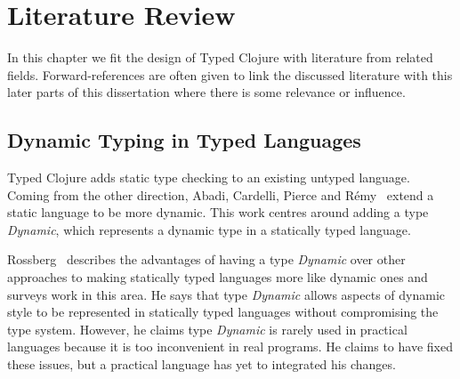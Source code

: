 
\chapter{Literature Review}

In this chapter we fit the design of Typed Clojure with literature from related fields.
Forward-references are often given to link the discussed literature with this later parts
of this dissertation
where there is some relevance or influence.


\section{Dynamic Typing in Typed Languages}

Typed Clojure adds static type checking to an existing untyped language.
Coming from the other direction, Abadi, Cardelli, Pierce and R\'{e}my~\cite{ACPR95}
extend a static language to be more dynamic.
This work centres around adding a type \emph{Dynamic}, which represents
a dynamic type in a statically typed language.

Rossberg~\cite{Ros07} describes the advantages of having a type
\emph{Dynamic} over other approaches to making statically typed languages
more like dynamic ones and surveys work in this area. 
He says that type \emph{Dynamic}
allows aspects of dynamic style to be represented in statically
typed languages without compromising the type system.
However, he claims type \emph{Dynamic} is rarely used in practical languages
because it is too inconvenient in real programs.
He claims to have fixed these issues, but a practical language has yet to integrated 
his changes.


